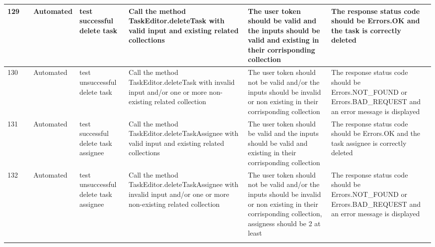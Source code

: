\documentclass{article}
\begin{document}
{\begin{tabular}{|
    >{\columncolor[HTML]{FFFFFF}}l |
    >{\columncolor[HTML]{FFFFFF}}c |
    >{\columncolor[HTML]{FFFFFF}}l |l|l|l|l|}
    129                                 & \cellcolor[HTML]{FFFFFF}                                    & {\color[HTML]{11734B} Automated} & test successful delete task                         & Call the method TaskEditor.deleteTask with valid input and existing related collections                                    & The user token should be valid and the inputs should be valid and existing in their corrisponding collection                                             & The response status code should be Errors.OK and the task is correctly deleted                                \\ \cline{1-1} \cline{3-7} 
    130                                 & \cellcolor[HTML]{FFFFFF}                                    & {\color[HTML]{11734B} Automated} & test unsuccessful delete task                       & Call the method TaskEditor.deleteTask with invalid input and/or one or more non-existing related collection                & The user token should not be valid and/or the inputs should be invalid or non existing in their corrisponding collection                                 & The response status code should be Errors.NOT\_FOUND or Errors.BAD\_REQUEST and an error message is displayed \\ \cline{1-1} \cline{3-7} 
    131                                 & \cellcolor[HTML]{FFFFFF}                                    & {\color[HTML]{11734B} Automated} & test successful delete task assignee                & Call the method TaskEditor.deleteTaskAssignee with valid input and existing related collections                            & The user token should be valid and the inputs should be valid and existing in their corrisponding collection                                             & The response status code should be Errors.OK and the task assignee is correctly deleted                       \\ \cline{1-1} \cline{3-7} 
    132                                 & \cellcolor[HTML]{FFFFFF}                                    & {\color[HTML]{11734B} Automated} & test unsuccessful delete task assignee              & Call the method TaskEditor.deleteTaskAssignee with invalid input and/or one or more non-existing related collection        & The user token should not be valid and/or the inputs should be invalid or non existing in their corrisponding collection, assigness should be 2 at least & The response status code should be Errors.NOT\_FOUND or Errors.BAD\_REQUEST and an error message is displayed \\ \cline{1-1} \cline{3-7} 

\end{tabular}}
\end{document}
